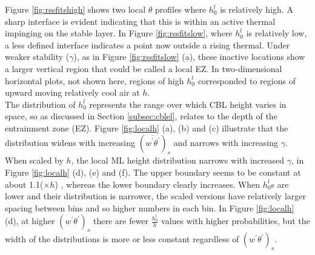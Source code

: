 

Figure \ref{fig:rssfitshigh} shows two local $\theta$ profiles where $h_{0}^{l}$ is relatively high.  
A sharp interface is evident indicating that this is within an active thermal impinging on the stable layer.
In Figure \ref{fig:rssfitslow}, where $h_{0}^{l}$ is relatively low, a less defined interface indicates 
a point now outside a rising thermal.  Under weaker stability ($\gamma$), as in Figure \ref{fig:rssfitslow} (a), 
these inactive locations show a larger vertical region that could be called a local \acs{EZ}.  
In two-dimensional horizontal plots, not shown here, regions of high 
$h_{0}^{l}$ corresponded to regions of upward moving relatively cool air at $h$.\\

The distribution of $h_{0}^{l}$ represents the range over which \acs{CBL} height varies in space, so as 
discussed in Section \ref{subsec:cblel}, relates to the depth of the entrainment zone (\acs{EZ}).
Figure \ref{fig:localh} (a), (b) and (c) illustrate that the distribution widens with increasing $(\overline{w^{'}\theta^{'}})_{s}$ and narrows with increasing $\gamma$.  When scaled by $h$, the local \acs{ML} height distribution 
narrows with increased $\gamma$, in Figure \ref{fig:localh} (d), (e) and (f).  The upper boundary seems to be constant at about 1.1($\times h$) , whereas the lower boundary clearly increases.  When $h_{0}^{l}$s are lower and their distribution is narrower, the scaled versions have relatively larger spacing between bins and so higher numbers in each bin. In Figure \ref{fig:localh} (d), at higher $(w^{'}\theta^{'})_{s}$ there are fewer $\frac{h_{0}^{l}}{h}$ values with higher probabilities, but the width of the distributions is more or less constant regardless of $(w^{'}\theta^{'})_{s}$.\\

